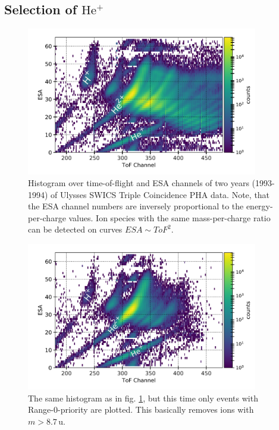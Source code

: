 \subsection{Selection of $\mathrm{He^{+}}$}

\begin{figure}[h]
	\includegraphics[width=0.9\textwidth]{Figures/epq_all.png}
	\centering
	\caption{Histogram over time-of-flight and ESA channels of two years (1993-1994) of Ulysses SWICS Triple Coincidence PHA data. Note, that the ESA channel numbers are inversely proportional to the energy-per-charge values. Ion species with the same mass-per-charge ratio can be detected on curves $ESA \sim ToF^2$.}
	\label{fig:epq_all}
\end{figure}

\begin{figure}[h]
	\includegraphics[width=0.9\textwidth]{Figures/epq_rng0.png}
	\centering
	\caption{The same histogram as in fig. \ref{fig:epq_all}, but this time only events with Range-0-priority are plotted. This basically removes ions with $m>8.7\,\mathrm{u}$.}
	\label{fig:epq_rng0}
\end{figure}


